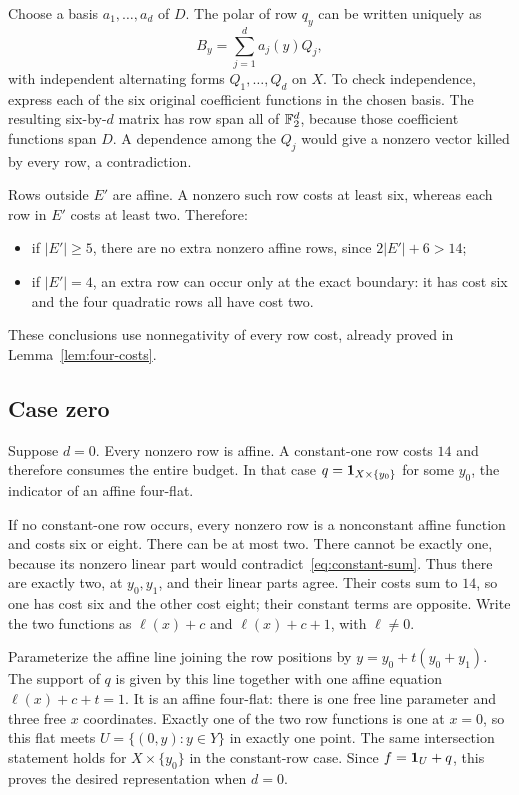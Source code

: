 Choose a basis $a_1,\ldots,a_d$ of $D$. The polar of row $q_y$ can be written uniquely as
\begin{equation}\label{eq:polar-code}
B_y=\sum_{j=1}^d a_j(y)Q_j,
\end{equation}
with independent alternating forms $Q_1,\ldots,Q_d$ on $X$. To check independence, express each of the six original coefficient functions in the chosen basis. The resulting six-by-$d$ matrix has row span all of $\mathbb F_2^d$, because those coefficient functions span $D$. A dependence among the $Q_j$ would give a nonzero vector killed by every row, a contradiction.

Rows outside $E'$ are affine. A nonzero such row costs at least six, whereas each row in $E'$ costs at least two. Therefore:
\begin{itemize}
\item if $|E'|\ge5$, there are no extra nonzero affine rows, since $2|E'|+6>14$;
\item if $|E'|=4$, an extra row can occur only at the exact boundary: it has cost six and the four quadratic rows all have cost two.
\end{itemize}
These conclusions use nonnegativity of every row cost, already proved in Lemma~\ref{lem:four-costs}.

\subsection{Case zero}
Suppose $d=0$. Every nonzero row is affine. A constant-one row costs $14$ and therefore consumes the entire budget. In that case $q=\mathbf 1_{X\times\{y_0\}}$ for some $y_0$, the indicator of an affine four-flat.

If no constant-one row occurs, every nonzero row is a nonconstant affine function and costs six or eight. There can be at most two. There cannot be exactly one, because its nonzero linear part would contradict~\eqref{eq:constant-sum}. Thus there are exactly two, at $y_0,y_1$, and their linear parts agree. Their costs sum to $14$, so one has cost six and the other cost eight; their constant terms are opposite. Write the two functions as $\ell(x)+c$ and $\ell(x)+c+1$, with $\ell\ne0$.

Parameterize the affine line joining the row positions by $y=y_0+t(y_0+y_1)$. The support of $q$ is given by this line together with one affine equation $\ell(x)+c+t=1$. It is an affine four-flat: there is one free line parameter and three free $x$ coordinates. Exactly one of the two row functions is one at $x=0$, so this flat meets $U=\{(0,y):y\in Y\}$ in exactly one point. The same intersection statement holds for $X\times\{y_0\}$ in the constant-row case. Since $f=\mathbf 1_U+q$, this proves the desired representation when $d=0$.

